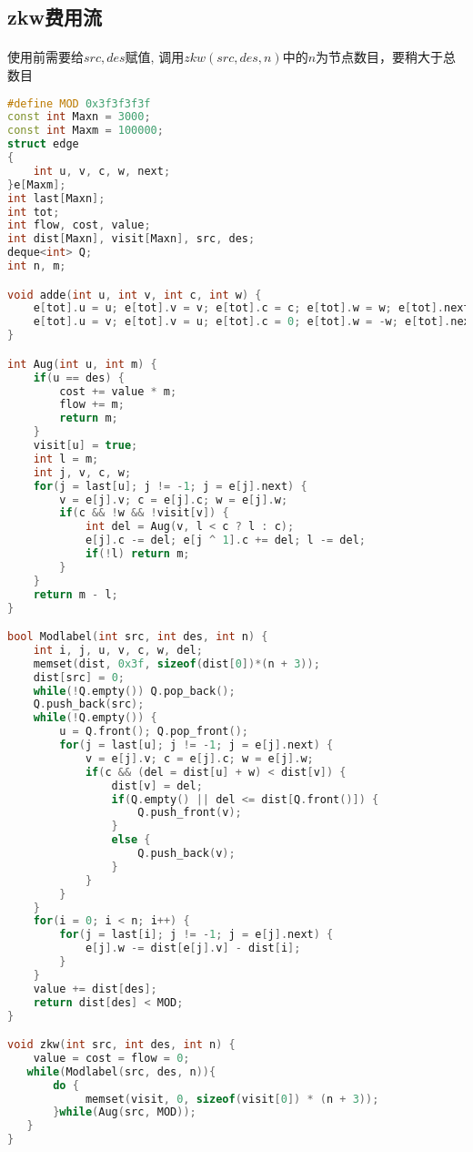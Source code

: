 \subsection{zkw费用流}
	\paragraph{}
		使用前需要给$ src, des $赋值, 调用$ zkw(src, des, n) $中的$n$为节点数目，要稍大于总数目
\begin{lstlisting}[language=C++]
#define MOD 0x3f3f3f3f
const int Maxn = 3000;
const int Maxm = 100000;
struct edge
{
    int u, v, c, w, next;
}e[Maxm];
int last[Maxn];
int tot;
int flow, cost, value;
int dist[Maxn], visit[Maxn], src, des;
deque<int> Q;
int n, m;

void adde(int u, int v, int c, int w) {
    e[tot].u = u; e[tot].v = v; e[tot].c = c; e[tot].w = w; e[tot].next = last[u]; last[u] = tot++;
    e[tot].u = v; e[tot].v = u; e[tot].c = 0; e[tot].w = -w; e[tot].next = last[v]; last[v] = tot++;
}

int Aug(int u, int m) {
    if(u == des) {
        cost += value * m;
        flow += m;
        return m;
    }
    visit[u] = true;
    int l = m;
    int j, v, c, w;
    for(j = last[u]; j != -1; j = e[j].next) {
        v = e[j].v; c = e[j].c; w = e[j].w;
        if(c && !w && !visit[v]) {
            int del = Aug(v, l < c ? l : c);
            e[j].c -= del; e[j ^ 1].c += del; l -= del;
            if(!l) return m;
        }
    }
    return m - l;
}

bool Modlabel(int src, int des, int n) {
    int i, j, u, v, c, w, del;
    memset(dist, 0x3f, sizeof(dist[0])*(n + 3));
    dist[src] = 0;
    while(!Q.empty()) Q.pop_back();
    Q.push_back(src);
    while(!Q.empty()) {
        u = Q.front(); Q.pop_front();
        for(j = last[u]; j != -1; j = e[j].next) {
            v = e[j].v; c = e[j].c; w = e[j].w;
            if(c && (del = dist[u] + w) < dist[v]) {
                dist[v] = del;
                if(Q.empty() || del <= dist[Q.front()]) {
                    Q.push_front(v);
                }
                else {
                    Q.push_back(v);
                }
            }
        }
    }
    for(i = 0; i < n; i++) {
        for(j = last[i]; j != -1; j = e[j].next) {
            e[j].w -= dist[e[j].v] - dist[i];
        }
    }
    value += dist[des];
    return dist[des] < MOD;
}

void zkw(int src, int des, int n) {
    value = cost = flow = 0;
   while(Modlabel(src, des, n)){
       do {
            memset(visit, 0, sizeof(visit[0]) * (n + 3));
       }while(Aug(src, MOD));
   }
}

\end{lstlisting}
